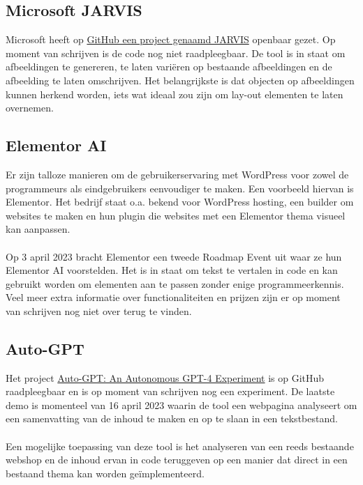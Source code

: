 \subsection{Microsoft JARVIS}
Microsoft heeft op \href{https://github.com/microsoft/JARVIS}{GitHub een project genaamd JARVIS} openbaar gezet. Op moment van schrijven is de code nog niet raadpleegbaar. De tool is in staat om afbeeldingen te genereren, te laten variëren op bestaande afbeeldingen en de afbeelding te laten omschrijven. Het belangrijkste is dat objecten op afbeeldingen kunnen herkend worden, iets wat ideaal zou zijn om lay-out elementen te laten overnemen.
\subsection{Elementor AI}
Er zijn talloze manieren om de gebruikerservaring met WordPress voor zowel de programmeurs als eindgebruikers eenvoudiger te maken. Een voorbeeld hiervan is Elementor. Het bedrijf staat o.a. bekend voor WordPress hosting, een builder om websites te maken en hun plugin die websites met een Elementor thema visueel kan aanpassen.
\\\\
Op 3 april 2023 bracht Elementor een tweede Roadmap Event \autocite{Laster2023} uit waar ze hun Elementor AI voorstelden. Het is in staat om tekst te vertalen in code en kan gebruikt worden om elementen aan te passen zonder enige programmeerkennis. Veel meer extra informatie over functionaliteiten en prijzen zijn er op moment van schrijven nog niet over terug te vinden.
\subsection{Auto-GPT}
Het project \href{https://github.com/Significant-Gravitas/Auto-GPT}{Auto-GPT: An Autonomous GPT-4 Experiment} is op GitHub raadpleegbaar en is op moment van schrijven nog een experiment. De laatste demo is momenteel van 16 april 2023 waarin de tool een webpagina analyseert om een samenvatting van de inhoud te maken en op te slaan in een tekstbestand.
\\\\
Een mogelijke toepassing van deze tool is het analyseren van een reeds bestaande webshop en de inhoud ervan in code teruggeven op een manier dat direct in een bestaand thema kan worden geïmplementeerd.
